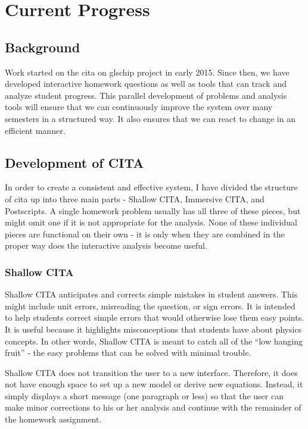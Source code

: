 \chapter[Current Progress]{Current Progress}

\section{Background}

Work started on the \gls{cita} on gls{chip} project in early 2015. Since then, we have developed interactive homework questions as well as tools that can track and analyze student progress. This parallel development of problems and analysis tools will ensure that we can continuously improve the system over many semesters in a structured way. It also ensures that we can react to change in an efficient manner.

\section{Development of CITA}

In order to create a consistent and effective system, I have divided the structure of \gls{cita} up into three main parts - Shallow CITA, Immersive CITA, and Postscripts. A single homework problem usually has all three of these pieces, but might omit one if it is not appropriate for the analysis. None of these individual pieces are functional on their own - it is only when they are combined in the proper way does the interactive analysis become useful.

\subsection{Shallow CITA}

Shallow CITA anticipates and corrects simple mistakes in student answers. This might include unit errors, misreading the question, or sign errors. It is intended to help students correct simple errors that would otherwise lose them easy points. It is useful because it highlights misconceptions that students have about physics concepts. In other words, Shallow CITA is meant to catch all of the ``low hanging fruit'' - the easy problems that can be solved with minimal trouble.

Shallow CITA does not transition the user to a new interface. Therefore, it does not have enough space to set up a new model or derive new equations. Instead, it simply displays a short message (one paragraph or less) so that the user can make minor corrections to his or her analysis and continue with the remainder of the homework assignment.


